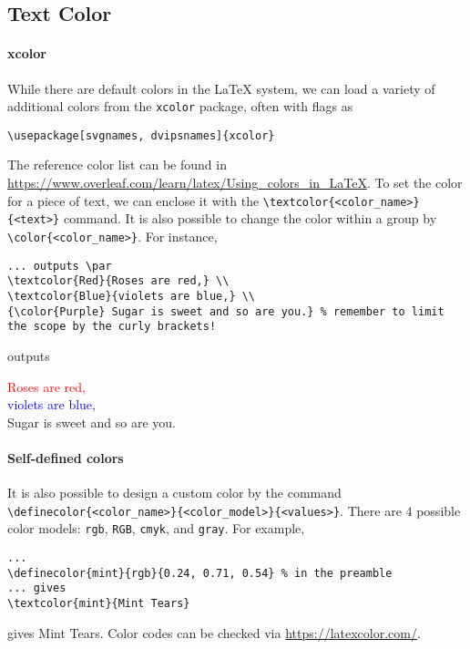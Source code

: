 \subsection{Text Color}

\paragraph{xcolor}
While there are default colors in the \LaTeX{} system, we can load a variety of additional colors from the \verb|xcolor| package, often with flags as
\begin{lstlisting}
\usepackage[svgnames, dvipsnames]{xcolor}    
\end{lstlisting}
The reference color list can be found in \href{https://www.overleaf.com/learn/latex/Using_colors_in_LaTeX}{https://www.overleaf.com/learn/latex/\allowbreak Using\_colors\_in\_LaTeX}. To set the color for a piece of text, we can enclose it with the \texttt{\textbackslash textcolor\{<color\_name>\}\{<text>\}} command. It is also possible to change the color within a group by \texttt{\textbackslash color\{<color\_name>\}}. For instance,
\begin{lstlisting}
... outputs \par
\textcolor{Red}{Roses are red,} \\
\textcolor{Blue}{violets are blue,} \\ 
{\color{Purple} Sugar is sweet and so are you.} % remember to limit the scope by the curly brackets!
\end{lstlisting}
outputs \par
\textcolor{Red}{Roses are red,} \\
\textcolor{Blue}{violets are blue,} \\ 
{\color{Purple} Sugar is sweet and so are you.}

\paragraph{Self-defined colors}
It is also possible to design a custom color by the command \texttt{\textbackslash definecolor\{<color\_name>\}\{<color\_model>\}\{<values>\}}. There are $4$ possible color models: \verb|rgb|, \verb|RGB|, \verb|cmyk|, and \verb|gray|. For example,
\begin{lstlisting}
...
\definecolor{mint}{rgb}{0.24, 0.71, 0.54} % in the preamble
... gives
\textcolor{mint}{Mint Tears}
\end{lstlisting}
gives \textcolor{mint}{Mint Tears}. Color codes can be checked via \href{https://latexcolor.com/}{https://latexcolor.com/}.\par


